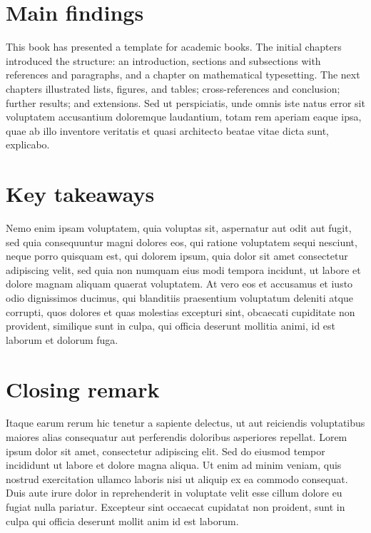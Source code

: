 
\section{Main findings} 

This book has presented a template for academic books. The initial chapters introduced the structure: an introduction, sections and subsections with references and paragraphs, and a chapter on mathematical typesetting. The next chapters illustrated lists, figures, and tables; cross-references and conclusion; further results; and extensions. Sed ut perspiciatis, unde omnis iste natus error sit voluptatem accusantium doloremque laudantium, totam rem aperiam eaque ipsa, quae ab illo inventore veritatis et quasi architecto beatae vitae dicta sunt, explicabo.

\section{Key takeaways} 

Nemo enim ipsam voluptatem, quia voluptas sit, aspernatur aut odit aut fugit, sed quia consequuntur magni dolores eos, qui ratione voluptatem sequi nesciunt, neque porro quisquam est, qui dolorem ipsum, quia dolor sit amet consectetur adipiscing velit, sed quia non numquam eius modi tempora incidunt, ut labore et dolore magnam aliquam quaerat voluptatem. At vero eos et accusamus et iusto odio dignissimos ducimus, qui blanditiis praesentium voluptatum deleniti atque corrupti, quos dolores et quas molestias excepturi sint, obcaecati cupiditate non provident, similique sunt in culpa, qui officia deserunt mollitia animi, id est laborum et dolorum fuga.

\section{Closing remark} 

Itaque earum rerum hic tenetur a sapiente delectus, ut aut reiciendis voluptatibus maiores alias consequatur aut perferendis doloribus asperiores repellat. Lorem ipsum dolor sit amet, consectetur adipiscing elit. Sed do eiusmod tempor incididunt ut labore et dolore magna aliqua. Ut enim ad minim veniam, quis nostrud exercitation ullamco laboris nisi ut aliquip ex ea commodo consequat. Duis aute irure dolor in reprehenderit in voluptate velit esse cillum dolore eu fugiat nulla pariatur. Excepteur sint occaecat cupidatat non proident, sunt in culpa qui officia deserunt mollit anim id est laborum.
